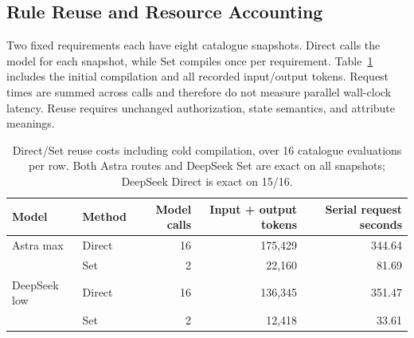 \subsection{Rule Reuse and Resource Accounting}
\label{app:cost}
Two fixed requirements each have eight catalogue snapshots. Direct calls the model for each snapshot, while Set compiles once per requirement. Table~\ref{tab:reuse} includes the initial compilation and all recorded input/output tokens. Request times are summed across calls and therefore do not measure parallel wall-clock latency. Reuse requires unchanged authorization, state semantics, and attribute meanings.

\begin{table}[!tbp]
\centering\small
\begin{tabular}{llrrr}
\toprule
Model & Method & Model calls & Input + output tokens & Serial request seconds\\
\midrule
Astra max & Direct & 16 & 175,429 & 344.64\\
& Set & 2 & 22,160 & 81.69\\
\midrule
DeepSeek low & Direct & 16 & 136,345 & 351.47\\
& Set & 2 & 12,418 & 33.61\\
\bottomrule
\end{tabular}
\caption{Direct/Set reuse costs including cold compilation, over 16 catalogue evaluations per row. Both Astra routes and DeepSeek Set are exact on all snapshots; DeepSeek Direct is exact on 15/16. }
\label{tab:reuse}
\end{table}
